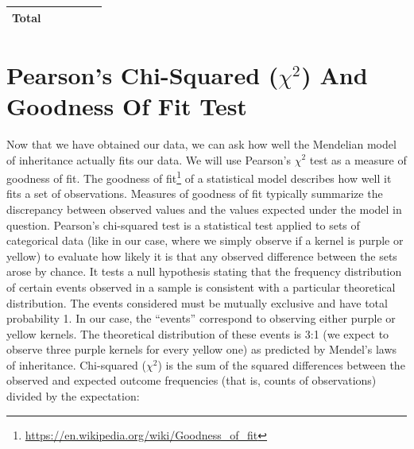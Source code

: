 \documentclass[]{book}
\let\rmarkdownfootnote\footnote%
\def\footnote{\protect\rmarkdownfootnote}
\renewcommand{\href}[2]{#2\footnote{\url{#1}}}
\begin{document}
\begin{longtable}[]{@{}clllll@{}}
\begin{minipage}[t]{0.05\columnwidth}\centering\strut
Total\strut
\end{minipage} & \begin{minipage}[t]{0.19\columnwidth}\raggedright\strut
\strut
\end{minipage} & \begin{minipage}[t]{0.19\columnwidth}\raggedright\strut
\strut
\end{minipage} & \begin{minipage}[t]{0.19\columnwidth}\raggedright\strut
\strut
\end{minipage} & \begin{minipage}[t]{0.19\columnwidth}\raggedright\strut
\strut
\end{minipage} & \begin{minipage}[t]{0.04\columnwidth}\raggedright\strut
\strut
\end{minipage}\tabularnewline
\bottomrule
\end{longtable}

\section{\texorpdfstring{Pearson's Chi-Squared (\(\chi^2\)) And Goodness
Of Fit
Test}{Pearson's Chi-Squared (\textbackslash{}chi\^{}2) And Goodness Of Fit Test}}\label{pearsons-chi-squared-chi2-and-goodness-of-fit-test}

Now that we have obtained our data, we can ask how well the Mendelian
model of inheritance actually fits our data. We will use Pearson's
\(\chi^2\) test as a measure of goodness of fit. The
\href{https://en.wikipedia.org/wiki/Goodness_of_fit}{goodness of fit} of
a statistical model describes how well it fits a set of observations.
Measures of goodness of fit typically summarize the discrepancy between
observed values and the values expected under the model in question.
Pearson's chi-squared test is a statistical test applied to sets of
categorical data (like in our case, where we simply observe if a kernel
is purple or yellow) to evaluate how likely it is that any observed
difference between the sets arose by chance. It tests a null hypothesis
stating that the frequency distribution of certain events observed in a
sample is consistent with a particular theoretical distribution. The
events considered must be mutually exclusive and have total probability
1. In our case, the ``events'' correspond to observing either purple or
yellow kernels. The theoretical distribution of these events is 3:1 (we
expect to observe three purple kernels for every yellow one) as
predicted by Mendel's laws of inheritance. Chi-squared (\(\chi^2\)) is
the sum of the squared differences between the observed and expected
outcome frequencies (that is, counts of observations) divided by the
expectation:
\end{document}
